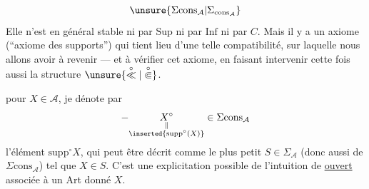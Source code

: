 
\[
\unsure{\Sigma\mathrm{cons}_{\mathcal A}|\Sigma_{\mathrm{cons}_{\mathcal A}}}
\]
Elle n'est  en général stable ni par $\mathrm{Sup}$ ni par $\mathrm{Inf}$ ni par $C$. Mais il y a un axiome (``axiome des supports'') qui tient lieu d'une telle compatibilité, sur laquelle nous allons avoir à revenir --- et à vérifier  cet axiome, en faisant intervenir cette fois aussi la structure $\unsure{\overset{\circ}{\ll}|\overset{\circ}{\Subset}}$.

  pour $X\in\mathcal A$, je dénote par
\[
-\underset{\substack{\Vert\\\inserted{\mathrm{supp}^{\circ}(X)}}}{X^{\circ}}\in\Sigma\mathrm{cons}_{\mathcal A}
\]
l'élément $\mathrm{supp}^{\circ}X$, qui peut être décrit comme le plus petit $S\in\Sigma_{\mathcal A}$ (donc aussi de $\Sigma\mathrm{cons}_{\mathcal A}$) tel que $X\in S$. C'est une explicitation possible de l'intuition de  \uline{ ouvert} associée à un Art donné $X$.
